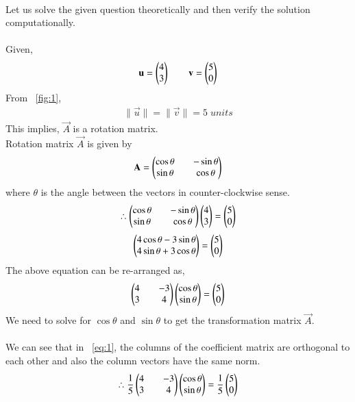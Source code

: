 \documentclass[journal]{IEEEtran}
\begin{document}
\solution \\
Let us solve the given question theoretically and then verify the solution computationally.\\
\\
Given,
\begin{align}
    \mathbf{u}=\begin{pmatrix}4\\3\end{pmatrix} \qquad \mathbf{v}=\begin{pmatrix}5\\0\end{pmatrix}
\end{align}
From ~\ref{fig:1},
\begin{align}
    \|\vec{u}\|=\|\vec{v}\|=5 \; units
\end{align}
This implies, $\vec{A}$ is a rotation matrix.\\
Rotation matrix $\vec{A}$ is given by 
\begin{align}
    \mathbf{A}=\begin{pmatrix}\cos{\theta}&&-\sin{\theta}\\\sin{\theta}&&\cos{\theta}\end{pmatrix}
\end{align}
where $\theta$ is the angle between the vectors in counter-clockwise sense.\\
\begin{align}
    \therefore \begin{pmatrix}\cos{\theta}&&-\sin{\theta}\\\sin{\theta}&&\cos{\theta}\end{pmatrix}\begin{pmatrix}4\\3\end{pmatrix}=\begin{pmatrix}5\\0\end{pmatrix}
\end{align}
\newpage
\vspace*{0.25cm}
\begin{align}
    \begin{pmatrix}4\cos{\theta}-3\sin{\theta}\\4\sin{\theta}+3\cos{\theta}\end{pmatrix}=\begin{pmatrix}5\\0\end{pmatrix}
\end{align}
The above equation can be re-arranged as,
\begin{align}
    \begin{pmatrix}4&&-3\\3&&4\end{pmatrix}\begin{pmatrix}\cos{\theta}\\\sin{\theta}\end{pmatrix}=\begin{pmatrix}5\\0\end{pmatrix} \label{eq:1}
\end{align}
We need to solve for $\cos{\theta}$ and $\sin{\theta}$ to get the transformation matrix $\vec{A}$.\\
\\
We can see that in ~\eqref{eq:1}, the columns of the coefficient matrix are orthogonal to each other and also the column vectors have the same norm.
\begin{align}
    \therefore \frac{1}{5}\begin{pmatrix}4&&-3\\3&&4\end{pmatrix}\begin{pmatrix}\cos{\theta}\\\sin{\theta}\end{pmatrix}=\frac{1}{5}\begin{pmatrix}5\\0\end{pmatrix}
\end{align}
\end{document}
